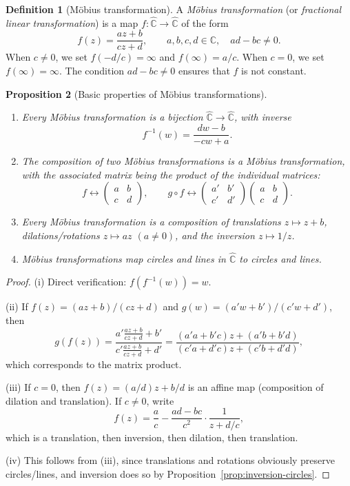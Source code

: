 \documentclass[12pt,a4paper,openany]{book}
\theoremstyle{definition}
\newtheorem{definition}{Definition}[chapter]
\theoremstyle{plain}
\newtheorem{proposition}[definition]{Proposition}
\theoremstyle{remark}
\newcommand{\C}{\mathbb{C}}
\begin{document}
\begin{definition}[M\"obius transformation]
\label{def:mobius}
A \emph{M\"obius transformation} (or \emph{fractional linear transformation}) is a map $f:\hat{\C}\to\hat{\C}$ of the form
\[
  f(z) = \frac{az+b}{cz+d}, \qquad a,b,c,d\in\C,\quad ad-bc\neq 0.
\]
When $c\neq 0$, we set $f(-d/c)=\infty$ and $f(\infty)=a/c$. When $c=0$, we set $f(\infty)=\infty$. The condition $ad-bc\neq 0$ ensures that $f$ is not constant.
\end{definition}

\begin{proposition}[Basic properties of M\"obius transformations]
\label{prop:mobius-properties}
\leavevmode
\begin{enumerate}[label=\textup{(\roman*)}]
  \item Every M\"obius transformation is a bijection $\hat{\C}\to\hat{\C}$, with inverse
    \[
      f^{-1}(w) = \frac{dw-b}{-cw+a}.
    \]
  \item The composition of two M\"obius transformations is a M\"obius transformation, with the associated matrix being the product of the individual matrices:
    \[
      f \leftrightarrow \begin{pmatrix} a & b \\ c & d \end{pmatrix}, \qquad g\circ f \leftrightarrow \begin{pmatrix} a' & b' \\ c' & d' \end{pmatrix}\begin{pmatrix} a & b \\ c & d \end{pmatrix}.
    \]
  \item Every M\"obius transformation is a composition of translations $z\mapsto z+b$, dilations/rotations $z\mapsto az$ $(a\neq 0)$, and the inversion $z\mapsto 1/z$.
  \item M\"obius transformations map circles and lines in $\hat{\C}$ to circles and lines.
\end{enumerate}
\end{proposition}

\begin{proof}
(i) Direct verification: $f(f^{-1}(w))=w$.

(ii) If $f(z)=(az+b)/(cz+d)$ and $g(w)=(a'w+b')/(c'w+d')$, then
\[
  g(f(z)) = \frac{a'\frac{az+b}{cz+d}+b'}{c'\frac{az+b}{cz+d}+d'} = \frac{(a'a+b'c)z+(a'b+b'd)}{(c'a+d'c)z+(c'b+d'd)},
\]
which corresponds to the matrix product.

(iii) If $c=0$, then $f(z)=(a/d)z+b/d$ is an affine map (composition of dilation and translation). If $c\neq 0$, write
\[
  f(z) = \frac{a}{c} - \frac{ad-bc}{c^2}\cdot\frac{1}{z+d/c},
\]
which is a translation, then inversion, then dilation, then translation.

(iv) This follows from (iii), since translations and rotations obviously preserve circles/lines, and inversion does so by Proposition~\ref{prop:inversion-circles}.
\end{proof}
\end{document}
